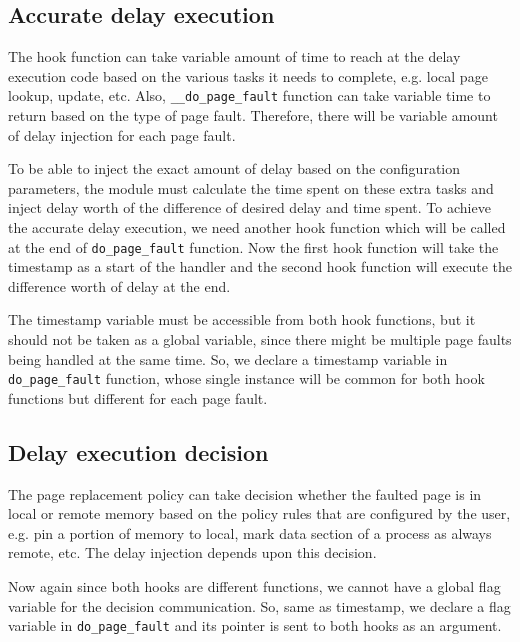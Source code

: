 \subsection{Accurate delay execution}
The hook function can take variable amount of time to reach at the delay execution code based on the various tasks it needs to complete, e.g. local page lookup, update, etc. Also, \verb|__do_page_fault| function can take variable time to return based on the type of page fault. Therefore, there will be variable amount of delay injection for each page fault.

To be able to inject the exact amount of delay based on the configuration parameters, the module must calculate the time spent on these extra tasks and inject delay worth of the difference of desired delay and time spent.
To achieve the accurate delay execution, we need another hook function which will be called at the end of \verb|do_page_fault| function. Now the first hook function will take the timestamp as a start of the handler and the second hook function will execute the difference worth of delay at the end.

The timestamp variable must be accessible from both hook functions, but it should not be taken as a global variable, since there might be multiple page faults being handled at the same time. So, we declare a timestamp variable in \verb|do_page_fault| function, whose single instance will be common for both hook functions but different for each page fault.

\subsection{Delay execution decision}
The page replacement policy can take decision whether the faulted page is in local or remote memory based on the policy rules that are configured by the user, e.g. pin a portion of memory to local, mark data section of a process as always remote, etc. The delay injection depends upon this decision.

Now again since both hooks are different functions, we cannot have a global flag variable for the decision communication. So, same as timestamp, we declare a flag variable in \verb|do_page_fault| and its pointer is sent to both hooks as an argument.

